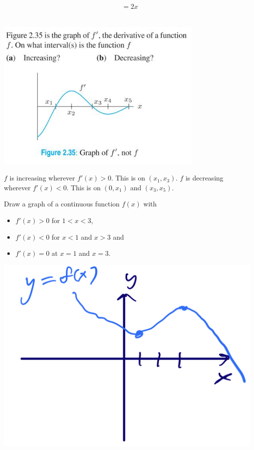 \documentclass[11pt]{exam}
\begin{document}
\begin{questions}
\begin{solution}
\begin{align*}
        & = 2x
      \end{align*}
    \end{solution}
  \question \, \\
    \includegraphics[width=4in]{no43.jpg}
    \begin{solution}
      \(f\) is increasing wherever \(f'(x) > 0\). This is on
      \((x_1,x_3)\). \(f\) is decreasing wherever \(f'(x) < 0\). This
      is on \((0,x_1)\) and \((x_3,x_5)\).
    \end{solution}
  \question Draw a graph of a continuous function $f(x)$ with
	\begin{itemize}
		\item $f'(x)>0$ for $1<x<3$,
		\item $f'(x)<0$ for $x<1$ and $x>3$ and
		\item $f'(x)=0$ at $x=1$ and $x=3$.
	\end{itemize}
        \begin{solution}
         \includegraphics[scale=0.3]{no6sketch}

\end{solution}
\end{questions}
\end{document}
